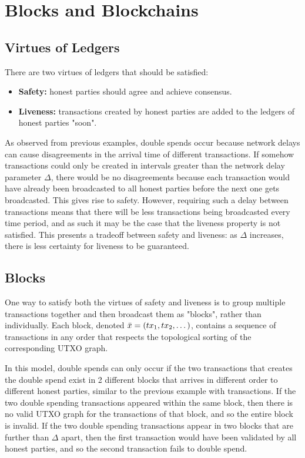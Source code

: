 \section{Blocks and Blockchains}
\subsection{Virtues of Ledgers}
There are two virtues of ledgers that should be satisfied:
\begin{itemize}
    \item \textbf{Safety:} honest parties should agree and achieve consensus.
    \item \textbf{Liveness:} transactions created by honest parties are added to the ledgers of honest parties "soon".
\end{itemize}

As observed from previous examples, double spends occur because network delays can cause disagreements in the arrival time of different transactions. If somehow transactions could only be created in intervals greater than the network delay parameter $\Delta$, there would be no disagreements because each transaction would have already been broadcasted to all honest parties before the next one gets broadcasted. This gives rise to safety. However, requiring such a delay between transactions means that there will be less transactions being broadcasted every time period, and as such it may be the case that the liveness property is not satisfied. This presents a tradeoff between safety and liveness: as $\Delta$ increases, there is less certainty for liveness to be guaranteed.

\subsection{Blocks}

One way to satisfy both the virtues of safety and liveness is to group multiple transactions together and then broadcast them as "blocks", rather than individually. Each block, denoted $\Bar{x} = (tx_1, tx_2, \dots)$, contains a sequence of transactions in any order that respects the topological sorting of the corresponding UTXO graph.

In this model, double spends can only occur if the two transactions that creates the double spend exist in 2 different blocks that arrives in different order to different honest parties, similar to the previous example with transactions. If the two double spending transactions appeared within the same block, then there is no valid UTXO graph for the transactions of that block, and so the entire block is invalid. If the two double spending transactions appear in two blocks that are further than $\Delta$ apart, then the first transaction would have been validated by all honest parties, and so the second transaction fails to double spend.

